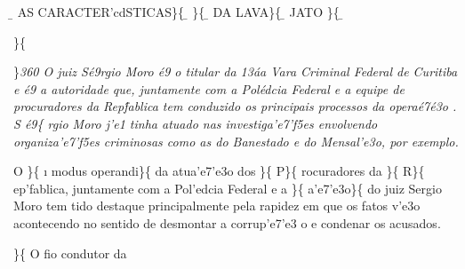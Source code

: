 \ltrch{} \b{} AS
CARACTER'cdSTICAS\}\{\rtlch{} \ab{} \ltrch{}
\b{} \}\{\rtlch{} \ab{}
\ltrch{} \b{} DA
LAVA\}\{\rtlch{} \ab{} \ltrch{} \b{}
JATO \tab    \}\{\rtlch{} \ab{} \ltrch{}
\b{} \par \}\{\rtlch{} 
\ltrch{}  \tab  
\par \}\pard \ltrpar\qj {}\sl360\widctlpar\wrapdefault\faauto{} {\rtlch{}  \ltrch{}  O juiz S\'e9rgio Moro \'e9 o titular da 13\'aa Vara Criminal }{\rtlch{}  
\ltrch{}  Federal }{\rtlch{}  \ltrch{}  de }{\rtlch{}  \ltrch{}  Curitiba}{\rtlch{}  \ltrch{}   e \'e9 a }{\rtlch{}  
\ltrch{}  autoridade}{\rtlch{}  \ltrch{}   que, juntamente com a Pol\'edcia Federal e a equipe de procuradores da Rep\'fablica tem conduzido os principais processos}{\rtlch{}  \ltrch{} 
  da opera\'e7\'e3o}{\rtlch{}  \ltrch{}  . S}{\rtlch{}  \ltrch{}  \'e9}\{\rtlch{}
 \ltrch{}  rgio Moro j'e1 tinha
atuado nas investiga'e7'f5es envolvendo organiza'e7'f5es criminosas como
as do Banestado e do Mensal'e3o, por exemplo. \par O \}\{\rtlch{}
\ai{} \ltrch{} \i{} modus
operandi\}\{\rtlch{}  \ltrch{}
 da atua'e7'e3o dos \}\{\rtlch{} 
\ltrch{}  P\}\{\rtlch{}  \ltrch{}
 rocuradores da \}\{\rtlch{} 
\ltrch{}  R\}\{\rtlch{}  \ltrch{}
 ep'fablica, juntamente com a Pol'edcia
Federal e a \}\{\rtlch{}  \ltrch{} 
a'e7'e3o\}\{\rtlch{}  \ltrch{}
 do juiz Sergio Moro tem tido destaque
principalmente pela rapidez em que os fatos v'e3o acontecendo no sentido
de desmontar a corrup'e7'e3 o e condenar os acusados.\\
\par \}\{\rtlch{}  \ltrch{}  O fio condutor da
